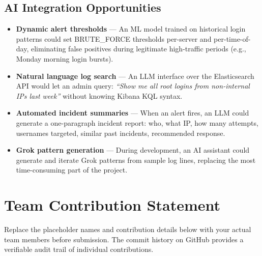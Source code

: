 \documentclass[12pt,a4paper]{article}
\begin{document}
\subsection{AI Integration Opportunities}

\begin{itemize}[leftmargin=2em]
  \item \textbf{Dynamic alert thresholds} — An ML model trained on historical
        login patterns could set BRUTE\_FORCE thresholds per-server and
        per-time-of-day, eliminating false positives during legitimate
        high-traffic periods (e.g., Monday morning login bursts).
  \item \textbf{Natural language log search} — An LLM interface over the
        Elasticsearch API would let an admin query:
        \textit{``Show me all root logins from non-internal IPs last week''}
        without knowing Kibana KQL syntax.
  \item \textbf{Automated incident summaries} — When an alert fires, an LLM
        could generate a one-paragraph incident report: who, what IP, how many
        attempts, usernames targeted, similar past incidents, recommended
        response.
  \item \textbf{Grok pattern generation} — During development, an AI assistant
        could generate and iterate Grok patterns from sample log lines,
        replacing the most time-consuming part of the project.
\end{itemize}

\newpage

\section{Team Contribution Statement}

\begin{infobox}
Replace the placeholder names and contribution details below with your actual
team members before submission. The commit history on GitHub provides a
verifiable audit trail of individual contributions.
\end{infobox}
\end{document}
